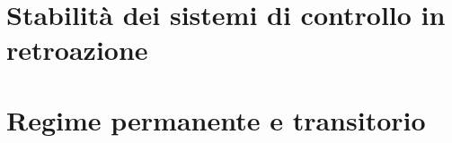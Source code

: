 \documentclass[../main.tex]{subfiles}
\begin{document}
\clearpage
\thispagestyle{empty}

\vspace*{7cm}
\section{Stabilità dei sistemi di controllo in retroazione}
\vspace*{1.5cm}








\clearpage
\thispagestyle{empty}

\vspace*{7cm}
\section{Regime permanente e transitorio}
\vspace*{1.5cm}
\end{document}
